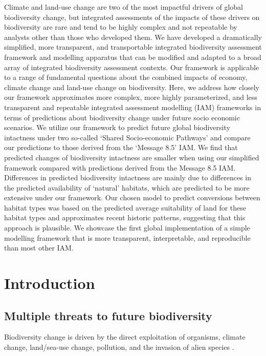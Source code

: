 \documentclass[titlesmallcaps,copyrightpage]{uomthesis}\usepackage[]{graphicx}\usepackage[]{color}
\begin{document}
Climate and land-use change are two of the most impactful drivers of global biodiversity change, but integrated assessments of the impacts of these drivers on biodiversity are rare and tend to be highly complex and not repeatable by analysts other than those who developed them. We have developed a dramatically simplified, more transparent, and transportable integrated biodiversity assessment framework and modelling apparatus that can be modified and adapted to a broad array of integrated biodiversity assessment contexts. Our framework is applicable to a range of fundamental questions about the combined impacts of economy, climate change and land-use change on biodiversity. Here, we address how closely our framework approximates more complex, more highly parameterized, and less transparent and repeatable integrated assessment modelling (IAM) frameworks in terms of predictions about biodiversity change under future socio economic scenarios. We utilize our framework to predict future global biodiversity intactness under two so-called `Shared Socio-economic Pathways' and compare our predictions to those derived from the `Message 8.5' IAM. We find that predicted changes of biodiversity intactness are smaller when using our simplified framework compared with predictions derived from the Message 8.5 IAM.  Differences in predicted biodiversity intactness are mainly due to differences in the predicted availability of ‘natural’ habitats, which are predicted to be more extensive under our framework. Our chosen model to predict conversions between habitat types was based on the predicted average suitability of land for these habitat types and approximates recent historic patterns, suggesting that this approach is plausible. We showcase the first global implementation of a simple modelling framework that is more transparent, interpretable, and reproducible than most other IAM.

\section{Introduction}

\subsection{Multiple threats to future biodiversity}

Biodiversity change is driven by the direct exploitation of organisms, climate change, land/sea-use change, pollution, and the invasion of alien species \citep{ipbes_summary_2019}.
\end{document}
